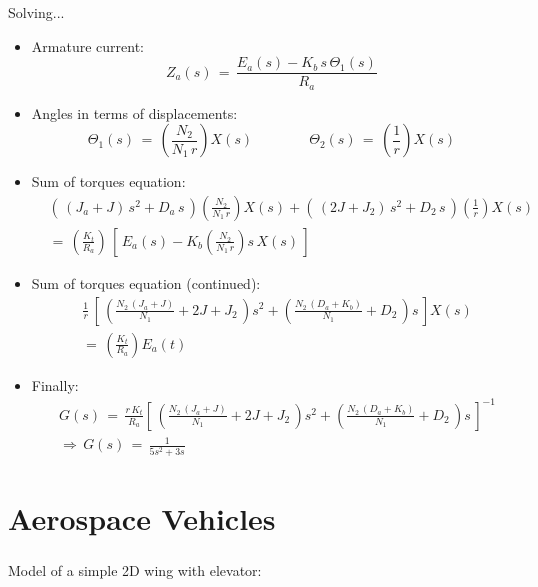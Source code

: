 \documentclass[ 10pt, xcolor = dvipsnames]{beamer}
\begin{document}
\begin{frame}[allowframebreaks]
Solving...
\begin{itemize}
\item Armature current:
\[
Z_a(s) \, = \, \frac{ E_a(s) - K_b \, s \, \Theta_1(s) }{R_a}
\]
\item Angles in terms of displacements:
\[
\Theta_1(s) \, = \, \left( \frac{N_2}{N_1 \, r} \right) X(s) \qquad \qquad
\Theta_2(s) \, = \, \left( \frac{1}{r} \right) X(s)
\]
\item Sum of torques equation: 
\begin{align*}
& ( \, ( J_a + J ) \, s^2 + D_a \, s \, )\left( \frac{N_2}{N_1 \, r} \right) X(s) + 
( \, ( 2J + J_2 ) \, s^2 + D_2 \, s \, ) \left( \frac{1}{r} \right) X(s) \\
& = \, \left( \frac{K_t}{R_a} \right) \, \left[ \, E_a(s) - K_b \left( \frac{N_2}{N_1 \, r} \right) s \, X(s) \, \right]
\end{align*}
\framebreak
\item Sum of torques equation (continued):
\begin{align*}
& \frac{1}{r} \, \left[ \,
\left( \frac{N_2 \, ( J_a + J )}{N_1} + 2J + J_2 \, \right) s^2 + 
\left( \frac{N_2 \, ( D_a + K_b )}{N_1} + D_2 \, \right) s \, \right] X(s) \\
& = \, \left( \frac{K_t}{R_a} \right) E_a(t)
\end{align*}
\item Finally:
\begin{align*}
& G(s) \, = \,
\frac{r \, K_t}{R_a}
\left[ \,
\left( \frac{N_2 \, ( J_a + J )}{N_1} + 2J + J_2 \, \right) s^2 + 
\left( \frac{N_2 \, ( D_a + K_b )}{N_1} + D_2 \, \right) s \, \right]^{-1} \\
& \Longrightarrow \, G(s) \, = \, \frac{1}{ 5 s^2 + 3s }
\end{align*}
\end{itemize}

\end{frame}

\section{Aerospace Vehicles}

\begin{frame}[allowframebreaks]
\frametitle{\insertsection}

Model of a simple 2D wing with elevator:
\begin{figure}[htb]
\centering
\def\svgwidth{0.9\columnwidth}

\end{figure}

\end{frame}
\end{document}
